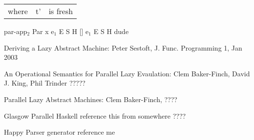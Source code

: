 \documentclass{llncs}
\begin{document}
\begin{tabular}{p{10mm}ll}
where	& t'	& is fresh
\end{tabular}
\medskip


\rrule	
	{par-app$_2$}
	{Par x e$_1$}	{E}	{S}	{H [\px \bind \blockedon{[ ]}]}
	{e$_1$}		{E}	{S}	{H}
dude
\medskip



%
%
\begin{thebibliography}{1}

Deriving a Lazy Abstract Machine:
Peter Sestoft,
J. Func. Programming 1, Jan 2003

An Operational Semantics for Parallel Lazy Evaulation:
Clem Baker-Finch, David J. King, Phil Trinder
?????

Parallel Lazy Abstract Machines:
Clem Baker-Finch,
????

Glasgow Parallel Haskell
reference this from somewhere
????

Happy Parser generator
reference me


\end{thebibliography}
\end{document}
